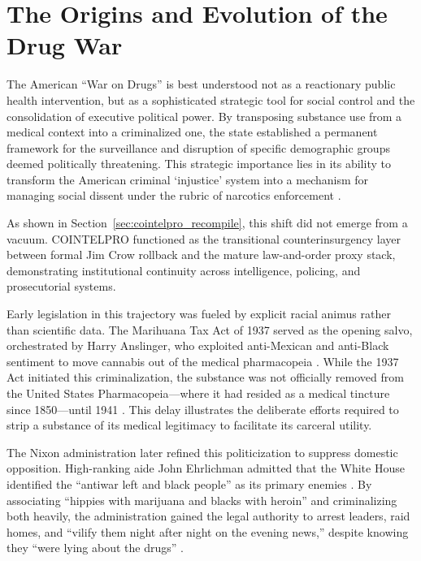 \documentclass[12pt,openany]{book}
\begin{document}
\section{The Origins and Evolution of the Drug War}

The American ``War on Drugs'' is best understood not as a reactionary public health intervention, but as a sophisticated strategic tool for social control and the consolidation of executive political power. By transposing substance use from a medical context into a criminalized one, the state established a permanent framework for the surveillance and disruption of specific demographic groups deemed politically threatening. This strategic importance lies in its ability to transform the American criminal `injustice' system into a mechanism for managing social dissent under the rubric of narcotics enforcement \cite{positive_health}.

As shown in Section~\ref{sec:cointelpro_recompile}, this shift did not emerge from a vacuum. COINTELPRO functioned as the transitional counterinsurgency layer between formal Jim Crow rollback and the mature law-and-order proxy stack, demonstrating institutional continuity across intelligence, policing, and prosecutorial systems.

Early legislation in this trajectory was fueled by explicit racial animus rather than scientific data. The Marihuana Tax Act of 1937 served as the opening salvo, orchestrated by Harry Anslinger, who exploited anti-Mexican and anti-Black sentiment to move cannabis out of the medical pharmacopeia \cite{wikipedia_marijuana}. While the 1937 Act initiated this criminalization, the substance was not officially removed from the United States Pharmacopeia---where it had resided as a medical tincture since 1850---until 1941 \cite{wikipedia_marijuana, degroote_centre}. This delay illustrates the deliberate efforts required to strip a substance of its medical legitimacy to facilitate its carceral utility.

The Nixon administration later refined this politicization to suppress domestic opposition. High-ranking aide John Ehrlichman admitted that the White House identified the ``antiwar left and black people'' as its primary enemies \cite{positive_health}. By associating ``hippies with marijuana and blacks with heroin'' and criminalizing both heavily, the administration gained the legal authority to arrest leaders, raid homes, and ``vilify them night after night on the evening news,'' despite knowing they ``were lying about the drugs'' \cite{positive_health}.
\end{document}
